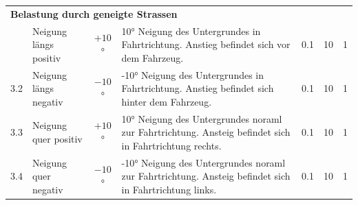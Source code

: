 \begin{landscape}
\begin{tabularx}{\linewidth}{llcXccc}
    \multicolumn{7}{l}{\textbf{Belastung durch geneigte Strassen}}\\
    \thickhline
    3.1	& Neigung längs positiv & $+10$° & 10° Neigung des Untergrundes in Fahrtrichtung. Anstieg befindet sich vor dem Fahrzeug. & 0.1 & 10 & 1\\
    3.2	& Neigung längs negativ & $-10$° & -10° Neigung des Untergrundes in Fahrtrichtung. Anstieg befindet sich hinter dem Fahrzeug. & 0.1 & 10 & 1\\
    3.3	& Neigung quer positiv  &$+10$° & 10° Neigung des Untergrundes noraml zur Fahrtrichtung. Ansteig befindet sich in Fahrtrichtung rechts. & 0.1 & 10 & 1\\
    3.4	& Neigung quer negativ  &$-10$° & -10° Neigung des Untergrundes noraml zur Fahrtrichtung. Ansteig befindet sich in Fahrtrichtung links. & 0.1 & 10 & 1\\

  \end{tabularx}
\end{landscape}

